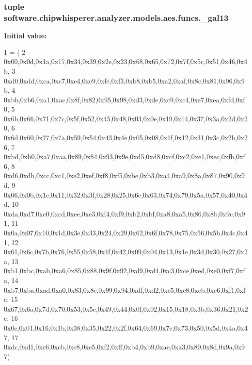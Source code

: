 \subsubsection[{\+\_\+gal13}]{\setlength{\rightskip}{0pt plus 5cm}tuple software.\+chipwhisperer.\+analyzer.\+models.\+aes.\+funcs.\+\_\+gal13}\label{namespacesoftware_1_1chipwhisperer_1_1analyzer_1_1models_1_1aes_1_1funcs_ae944000b9a17deee0b27e0ab298f72ee}
{\bfseries Initial value\+:}
\begin{DoxyCode}
1 = (
2 0x00,0x0d,0x1a,0x17,0x34,0x39,0x2e,0x23,0x68,0x65,0x72,0x7f,0x5c,0x51,0x46,0x4b,
3 0xd0,0xdd,0xca,0xc7,0xe4,0xe9,0xfe,0xf3,0xb8,0xb5,0xa2,0xaf,0x8c,0x81,0x96,0x9b,
4 0xbb,0xb6,0xa1,0xac,0x8f,0x82,0x95,0x98,0xd3,0xde,0xc9,0xc4,0xe7,0xea,0xfd,0xf0,
5 0x6b,0x66,0x71,0x7c,0x5f,0x52,0x45,0x48,0x03,0x0e,0x19,0x14,0x37,0x3a,0x2d,0x20,
6 0x6d,0x60,0x77,0x7a,0x59,0x54,0x43,0x4e,0x05,0x08,0x1f,0x12,0x31,0x3c,0x2b,0x26,
7 0xbd,0xb0,0xa7,0xaa,0x89,0x84,0x93,0x9e,0xd5,0xd8,0xcf,0xc2,0xe1,0xec,0xfb,0xf6,
8 0xd6,0xdb,0xcc,0xc1,0xe2,0xef,0xf8,0xf5,0xbe,0xb3,0xa4,0xa9,0x8a,0x87,0x90,0x9d,
9 0x06,0x0b,0x1c,0x11,0x32,0x3f,0x28,0x25,0x6e,0x63,0x74,0x79,0x5a,0x57,0x40,0x4d,
10 0xda,0xd7,0xc0,0xcd,0xee,0xe3,0xf4,0xf9,0xb2,0xbf,0xa8,0xa5,0x86,0x8b,0x9c,0x91,
11 0x0a,0x07,0x10,0x1d,0x3e,0x33,0x24,0x29,0x62,0x6f,0x78,0x75,0x56,0x5b,0x4c,0x41,
12 0x61,0x6c,0x7b,0x76,0x55,0x58,0x4f,0x42,0x09,0x04,0x13,0x1e,0x3d,0x30,0x27,0x2a,
13 0xb1,0xbc,0xab,0xa6,0x85,0x88,0x9f,0x92,0xd9,0xd4,0xc3,0xce,0xed,0xe0,0xf7,0xfa,
14 0xb7,0xba,0xad,0xa0,0x83,0x8e,0x99,0x94,0xdf,0xd2,0xc5,0xc8,0xeb,0xe6,0xf1,0xfc,
15 0x67,0x6a,0x7d,0x70,0x53,0x5e,0x49,0x44,0x0f,0x02,0x15,0x18,0x3b,0x36,0x21,0x2c,
16 0x0c,0x01,0x16,0x1b,0x38,0x35,0x22,0x2f,0x64,0x69,0x7e,0x73,0x50,0x5d,0x4a,0x47,
17 0xdc,0xd1,0xc6,0xcb,0xe8,0xe5,0xf2,0xff,0xb4,0xb9,0xae,0xa3,0x80,0x8d,0x9a,0x97)
\end{DoxyCode}
\hypertarget{namespacesoftware_1_1chipwhisperer_1_1analyzer_1_1models_1_1aes_1_1funcs_abe5cb75c2c9a3000516e208a0a910756}{}
